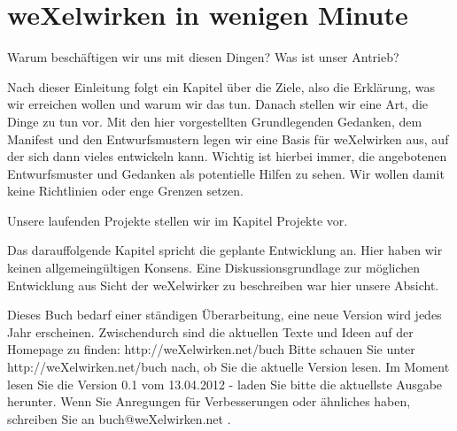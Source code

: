  \section{weXelwirken in wenigen Minute}

Warum beschäftigen wir uns mit diesen Dingen? Was ist unser Antrieb?


Nach dieser Einleitung folgt ein Kapitel über die Ziele, also die Erklärung, was wir erreichen wollen und warum wir das tun.
%
Danach stellen wir eine Art, die Dinge zu tun vor.
%
Mit den hier vorgestellten Grundlegenden Gedanken, dem Manifest und den Entwurfsmustern legen wir eine Basis für weXelwirken aus, auf der sich dann vieles entwickeln kann.
%
Wichtig ist hierbei immer, die angebotenen Entwurfsmuster und Gedanken als potentielle Hilfen zu sehen. 
%
Wir wollen damit keine Richtlinien oder enge Grenzen setzen.



Unsere laufenden Projekte stellen wir im Kapitel Projekte vor.



Das darauffolgende Kapitel spricht die geplante Entwicklung an.
%
Hier haben wir keinen allgemeingültigen Konsens.
%
Eine Diskussionsgrundlage zur möglichen Entwicklung aus Sicht der weXelwirker zu beschreiben war hier unsere Absicht.




Dieses Buch bedarf einer ständigen Überarbeitung, eine neue Version wird jedes Jahr erscheinen.
%
Zwischendurch sind die aktuellen Texte und Ideen auf der Homepage zu finden: http://weXelwirken.net/buch
%
Bitte schauen Sie unter\\ http://weXelwirken.net/buch nach, ob Sie die aktuelle Version lesen.
%
Im Moment lesen Sie die Version 0.1 vom 13.04.2012 - laden Sie bitte die aktuellste Ausgabe herunter.
%
Wenn Sie Anregungen für Verbesserungen oder ähnliches haben, schreiben Sie an buch@weXelwirken.net .
